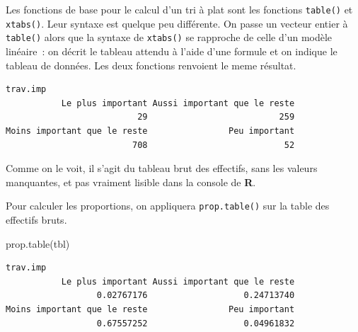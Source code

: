 \documentclass[
  letterpaper,
  DIV=11,
  numbers=noendperiod,
  oneside]{scrreprt}
\newenvironment{Shaded}{\begin{snugshade}}{\end{snugshade}}
\newcommand{\AttributeTok}[1]{\textcolor[rgb]{0.40,0.45,0.13}{#1}}
\newcommand{\FunctionTok}[1]{\textcolor[rgb]{0.28,0.35,0.67}{#1}}
\newcommand{\NormalTok}[1]{\textcolor[rgb]{0.00,0.23,0.31}{#1}}
\newcommand{\OtherTok}[1]{\textcolor[rgb]{0.00,0.23,0.31}{#1}}
\newcommand{\SpecialCharTok}[1]{\textcolor[rgb]{0.37,0.37,0.37}{#1}}
\begin{document}
Les fonctions de base pour le calcul d'un tri à plat sont les fonctions
\texttt{table()} et \texttt{xtabs()}. Leur syntaxe est quelque peu
différente. On passe un vecteur entier à \texttt{table()} alors que la
syntaxe de \texttt{xtabs()} se rapproche de celle d'un modèle linéaire~:
on décrit le tableau attendu à l'aide d'une formule et on indique le
tableau de données. Les deux fonctions renvoient le meme résultat.

\begin{Shaded}
\end{Shaded}

\begin{verbatim}
trav.imp
           Le plus important Aussi important que le reste 
                          29                          259 
Moins important que le reste                Peu important 
                         708                           52 
\end{verbatim}

Comme on le voit, il s'agit du tableau brut des effectifs, sans les
valeurs manquantes, et pas vraiment lisible dans la console de
\textbf{R}.

Pour calculer les proportions, on appliquera \texttt{prop.table()} sur
la table des effectifs bruts.

\begin{Shaded}
\begin{Highlighting}[]
\FunctionTok{prop.table}\NormalTok{(tbl)}
\end{Highlighting}
\end{Shaded}

\begin{verbatim}
trav.imp
           Le plus important Aussi important que le reste 
                  0.02767176                   0.24713740 
Moins important que le reste                Peu important 
                  0.67557252                   0.04961832 
\end{verbatim}
\end{document}
